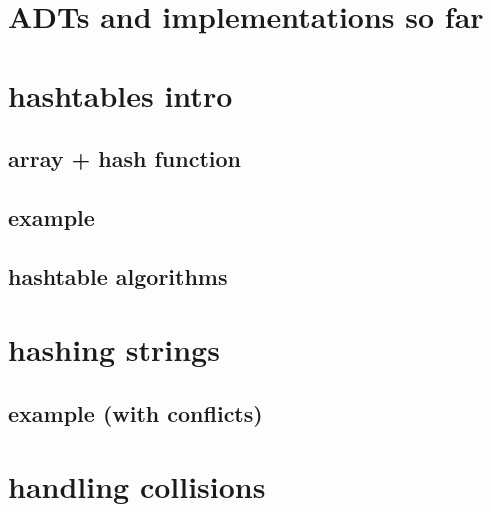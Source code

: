 
\begin{frame}
    \titlepage
\end{frame}

\section{ADTs and implementations so far}



\section{hashtables intro}

\subsection{array + hash function}







\subsection{example}


\subsection{hashtable algorithms}


\section{hashing strings}


\subsection{example (with conflicts)}


\section{handling collisions}





